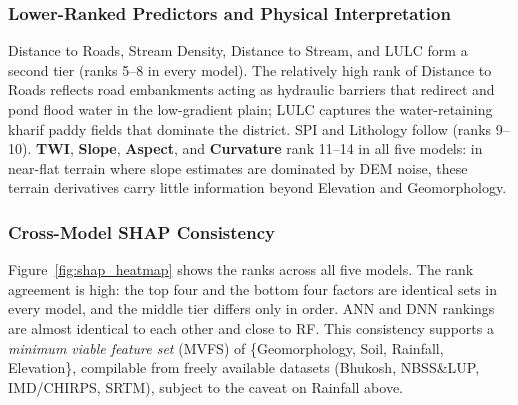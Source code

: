 \documentclass[12pt, a4paper]{article}
\begin{document}
\subsubsection{Lower-Ranked Predictors and Physical Interpretation}

Distance to Roads, Stream Density, Distance to Stream, and LULC form a second tier (ranks 5--8 in every model). The relatively high rank of Distance to Roads reflects road embankments acting as hydraulic barriers that redirect and pond flood water in the low-gradient plain; LULC captures the water-retaining kharif paddy fields that dominate the district. SPI and Lithology follow (ranks 9--10). \textbf{TWI}, \textbf{Slope}, \textbf{Aspect}, and \textbf{Curvature} rank 11--14 in all five models: in near-flat terrain where slope estimates are dominated by DEM noise, these terrain derivatives carry little information beyond Elevation and Geomorphology.

\subsubsection{Cross-Model SHAP Consistency}

Figure~\ref{fig:shap_heatmap} shows the ranks across all five models. The rank agreement is high: the top four and the bottom four factors are identical sets in every model, and the middle tier differs only in order. ANN and DNN rankings are almost identical to each other and close to RF. This consistency supports a \textit{minimum viable feature set} (MVFS) of \{Geomorphology, Soil, Rainfall, Elevation\}, compilable from freely available datasets (Bhukosh, NBSS\&LUP, IMD/CHIRPS, SRTM), subject to the caveat on Rainfall above.


\end{document}
